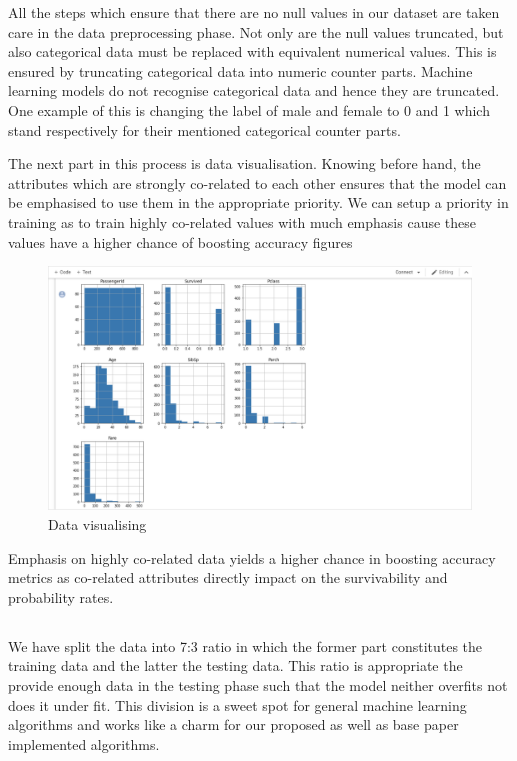 \documentclass[12pt]{article}
\newcommand{\nd}{\noindent}
\newcommand{\subsize}{\fontsize{14pt}{12pt}\selectfont}
\begin{document}
\nd All the steps which ensure that there are no null values in our dataset are taken care in the data preprocessing phase. Not only are the null values truncated, but also categorical data must be replaced with equivalent numerical values. This is ensured by truncating categorical data into numeric counter parts. Machine learning models do not recognise categorical data and hence they are truncated. One example of this is changing the label of male and female to 0 and 1 which stand respectively for their mentioned categorical counter parts.

\nd The next part in this process is data visualisation. Knowing before hand, the attributes which are strongly co-related to each other ensures that the model can be emphasised to use them in the appropriate priority. We can setup a priority in training as to train highly co-related values with much emphasis cause these values have a higher chance of boosting accuracy figures 

\begin{center}
\begin{figure}[h]
\centerline{\includegraphics[scale=.32]{visual.png}}
\caption{Data visualising}
\end{figure}
\end{center}

\nd Emphasis on highly co-related data yields a higher chance in boosting accuracy metrics as co-related attributes directly impact on the survivability and probability rates.

\newpage
\subsection{\textbf{\subsize{TRAIN AND TEST SPLIT}}}
We have split the data into 7:3 ratio in which the former part constitutes the training data and the latter the testing data. This ratio is appropriate the provide enough data in the testing phase such that the model neither overfits not does it under fit. This division is a sweet spot for general machine learning algorithms and works like a charm for our proposed as well as base paper implemented algorithms. 
\end{document}
